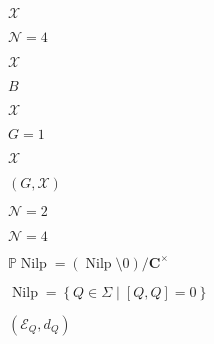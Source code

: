 \begin{preview}
\setcounter{equation}{0}%
\( \mathcal{X} \)
\end{preview}

\begin{preview}
\setcounter{equation}{0}%
\( \mathcal{N}=4 \)
\end{preview}

\begin{preview}
\setcounter{equation}{0}%
\( \mathcal{X} \)
\end{preview}

\begin{preview}
\setcounter{equation}{0}%
\( B \)
\end{preview}

\begin{preview}
\setcounter{equation}{0}%
\( \mathcal{X} \)
\end{preview}

\begin{preview}
\setcounter{equation}{0}%
\( G =1 \)
\end{preview}

\begin{preview}
\setcounter{equation}{0}%
\( \mathcal{X} \)
\end{preview}

\begin{preview}
\setcounter{equation}{0}%
\( (G, \mathcal{X}) \)
\end{preview}

\begin{preview}
\setcounter{equation}{0}%
\( \mathcal{N}=2 \)
\end{preview}

\begin{preview}
\setcounter{equation}{0}%
\( \mathcal{N}=4 \)
\end{preview}

\begin{preview}
\setcounter{equation}{0}%
\( \mathbb{P} \operatorname{Nilp} = (\operatorname{Nilp} \setminus 0 )/ \mathbf{C}^{\times } \)
\end{preview}

\begin{preview}
\setcounter{equation}{0}%
\( \operatorname{Nilp} = \left\{ Q \in \Sigma\mid [Q,Q]=0 \right\} \)
\end{preview}

\begin{preview}
\setcounter{equation}{0}%
\( ( \mathcal{E}_Q , d_Q) \)
\end{preview}

